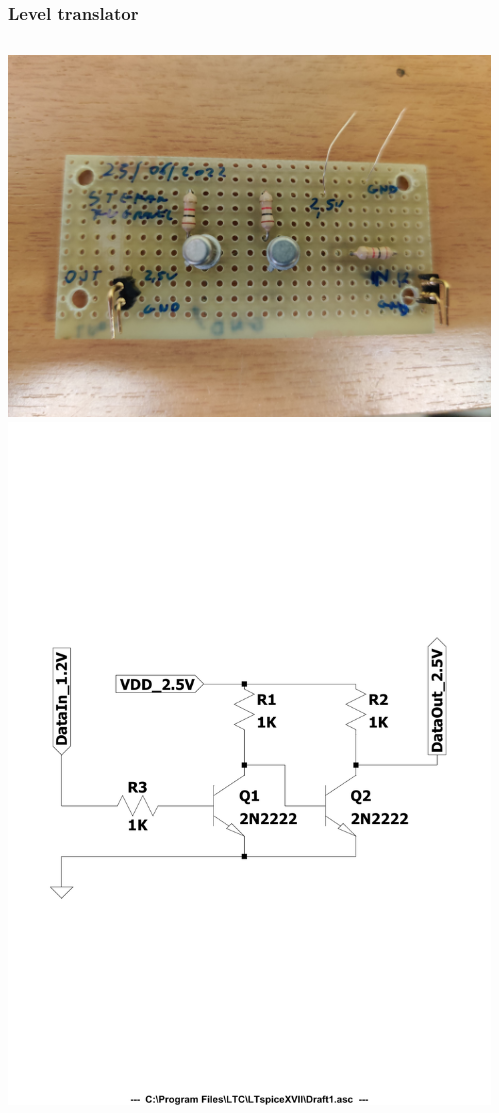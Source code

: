 \documentclass[aspectratio=169]{beamer}
\begin{document}
	\begin{frame}
	\frametitle{Level translator}
	\begin{columns}
		\begin{center}
			\includegraphics[width=0.8 \textwidth]{IMG/level_translator_front-min.jpg}
			\includegraphics[width=0.8 \textwidth]{IMG/Diagram_cropped.pdf}
		\end{center}
		\begin{itemize}

\end{itemize}
\end{columns}
\end{frame}
\end{document}
